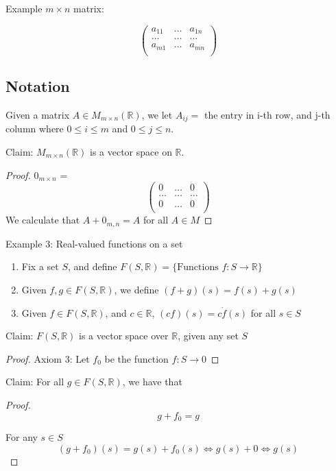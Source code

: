\documentclass{article}
\newtheorem{one minute paper}[theorem]{One Minute Paper}
\begin{document}
Example $m \times n$ matrix:

\begin{equation}
    \begin{pmatrix}
        a_{11} & \dots & a_{1n} \\
        \dots & \dots & \dots \\
        a_{m1} & \dots & a_{mn} \\
    \end{pmatrix}
\end{equation}

\subsection*{Notation}

Given a matrix $A \in M_{m\times n}(\mathbb{R})$, we let $A_{ij} = $ the entry in i-th row, and j-th column where $0 \leq i \leq m$ and $0 \leq j \leq n$. 

Claim: $M_{m\times n}(\mathbb{R})$ is a vector space on $\mathbb{R}$.

\begin{proof}
   $ 0_{m \times n}$ = 
   \[
    \begin{pmatrix}
        0 & \dots & 0 \\
        \dots & \dots & \dots \\
        0 & \dots & 0 \\
    \end{pmatrix}
    \]
    We calculate that $A + 0_{m,n} = A$ for all $A \in M$
\end{proof}

Example 3: Real-valued functions on a set
\begin{enumerate}
    \item Fix a set $S$, and define $F(S,\mathbb{R}) = \{ \text{Functions } f: S \rightarrow \mathbb{R}\}$
    \item Given $f,g \in F(S, \mathbb{R})$, we define $(f + g)(s) = f(s) + g(s)$
    \item Given $f \in F(S, \mathbb{R})$, and $c \in \mathbb{R}$, $(cf)(s) = c \dot f(s)$ for all $s \in S$ 
\end{enumerate}

Claim: $F(S,\mathbb{R})$ is a vector space over $\mathbb{R}$, given any set $S$

\begin{proof}
    Axiom 3: Let $f_0$ be the function $f: S \rightarrow 0$
\end{proof}

Claim: For all $g \in F(S, \mathbb{R})$, we have that 
\begin{proof}
    \begin{equation}
        g + f_0 = g
    \end{equation}
    
    For any $s \in S$
    \begin{equation}
        (g+f_0)(s) = g(s) + f_0(s) \iff g(s) + 0 \iff g(s)
    \end{equation}
\end{proof} 
\end{document}
